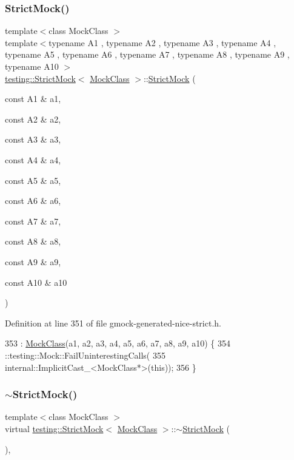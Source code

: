 \subsubsection{\texorpdfstring{Strict\+Mock()}{StrictMock()}\hspace{0.1cm}{\footnotesize\ttfamily [11/11]}}
{\footnotesize\ttfamily template$<$class Mock\+Class $>$ \\
template$<$typename A1 , typename A2 , typename A3 , typename A4 , typename A5 , typename A6 , typename A7 , typename A8 , typename A9 , typename A10 $>$ \\
\hyperlink{classtesting_1_1StrictMock}{testing\+::\+Strict\+Mock}$<$ \hyperlink{classMockClass}{Mock\+Class} $>$\+::\hyperlink{classtesting_1_1StrictMock}{Strict\+Mock} (\begin{DoxyParamCaption}\item[{const A1 \&}]{a1,  }\item[{const A2 \&}]{a2,  }\item[{const A3 \&}]{a3,  }\item[{const A4 \&}]{a4,  }\item[{const A5 \&}]{a5,  }\item[{const A6 \&}]{a6,  }\item[{const A7 \&}]{a7,  }\item[{const A8 \&}]{a8,  }\item[{const A9 \&}]{a9,  }\item[{const A10 \&}]{a10 }\end{DoxyParamCaption})\hspace{0.3cm}{\ttfamily [inline]}}



Definition at line 351 of file gmock-\/generated-\/nice-\/strict.\+h.


\begin{DoxyCode}
353                       : \hyperlink{classMockClass}{MockClass}(a1, a2, a3, a4, a5, a6, a7, a8, a9, a10) \{
354     ::testing::Mock::FailUninterestingCalls(
355         internal::ImplicitCast\_<MockClass*>(\textcolor{keyword}{this}));
356   \}
\end{DoxyCode}
\mbox{\label{classtesting_1_1StrictMock_ae22ba62955775b26c88937ee225db528}} 
\subsubsection{\texorpdfstring{$\sim$\+Strict\+Mock()}{~StrictMock()}}
{\footnotesize\ttfamily template$<$class Mock\+Class $>$ \\
virtual \hyperlink{classtesting_1_1StrictMock}{testing\+::\+Strict\+Mock}$<$ \hyperlink{classMockClass}{Mock\+Class} $>$\+::$\sim$\hyperlink{classtesting_1_1StrictMock}{Strict\+Mock} (\begin{DoxyParamCaption}{ }\end{DoxyParamCaption})\hspace{0.3cm}{\ttfamily [inline]}, {\ttfamily [virtual]}}



